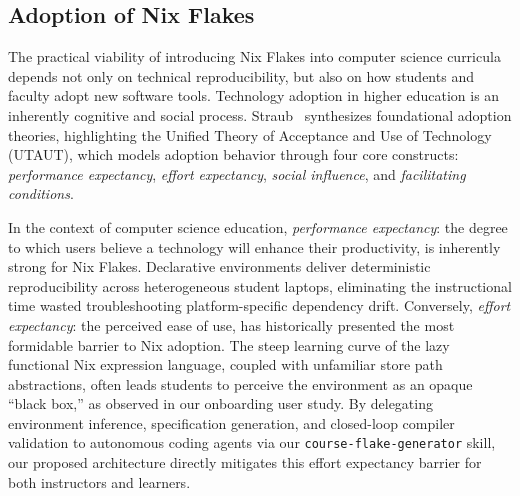 \subsection{Adoption of Nix Flakes}

The practical viability of introducing Nix Flakes into computer science curricula
depends not only on technical reproducibility, but also on how students and
faculty adopt new software tools. Technology adoption in higher education is an inherently
cognitive and social process. Straub~\cite{straubUnderstandingTechnologyAdoption2009}
synthesizes foundational adoption theories, highlighting the Unified Theory of Acceptance
and Use of Technology (UTAUT), which models adoption behavior through four core
constructs: \emph{performance expectancy}, \emph{effort expectancy}, \emph{social
influence}, and \emph{facilitating conditions}.

In the context of computer science education, \emph{performance expectancy}: the degree
to which users believe a technology will enhance their productivity, is
inherently strong for Nix Flakes. Declarative environments deliver deterministic reproducibility
across heterogeneous student laptops, eliminating the instructional time wasted
troubleshooting platform-specific dependency drift. Conversely, \emph{effort
expectancy}: the perceived ease of use, has historically presented the most formidable
barrier to Nix adoption. The steep learning curve of the lazy functional Nix
expression language, coupled with unfamiliar store path abstractions, often
leads students to perceive the environment as an opaque ``black box,'' as observed
in our onboarding user study. By delegating environment inference, specification generation,
and closed-loop compiler validation to autonomous coding agents via our \texttt{course-flake-generator}
skill, our proposed architecture directly mitigates this effort expectancy
barrier for both instructors and learners.

